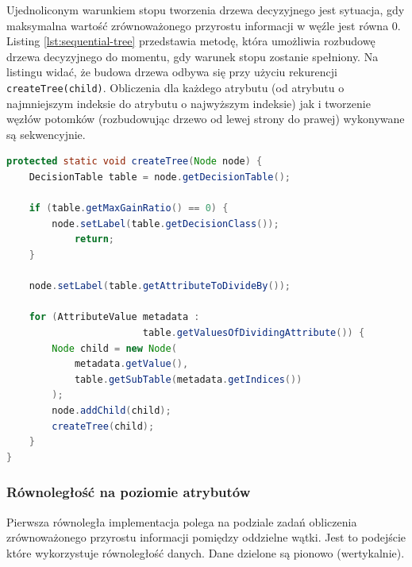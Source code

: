 \documentclass[12pt]{article}
\begin{document}
Ujednoliconym warunkiem stopu tworzenia drzewa decyzyjnego jest sytuacja, gdy maksymalna wartość zrównoważonego
przyrostu informacji w węźle jest równa 0. Listing \ref{lst:sequential-tree} przedstawia metodę, która
umożliwia rozbudowę drzewa decyzyjnego do momentu, gdy warunek stopu zostanie spełniony. Na listingu widać, że budowa
drzewa odbywa się przy użyciu rekurencji \verb|createTree(child)|.
Obliczenia dla każdego atrybutu (od atrybutu o najmniejszym indeksie do atrybutu o najwyższym indeksie) jak i tworzenie węzłów potomków
(rozbudowując drzewo od lewej strony do prawej) wykonywane są sekwencyjnie. 

\begin{lstlisting}[language=java, caption=Rekurencyjne tworzenie drzewa decyzyjnego,frame=single,label={lst:sequential-tree}]
protected static void createTree(Node node) {
    DecisionTable table = node.getDecisionTable();

    if (table.getMaxGainRatio() == 0) {
        node.setLabel(table.getDecisionClass());
            return;
    }

    node.setLabel(table.getAttributeToDivideBy());

    for (AttributeValue metadata :
                        table.getValuesOfDividingAttribute()) {
        Node child = new Node(
            metadata.getValue(),
            table.getSubTable(metadata.getIndices())
        );
        node.addChild(child);
        createTree(child);
    }
}
\end{lstlisting}

\subsubsection{Równoległość na poziomie atrybutów}\label{executor-service}

Pierwsza równoległa implementacja polega na podziale zadań obliczenia zrównoważonego przyrostu informacji pomiędzy oddzielne wątki.
Jest to podejście które wykorzystuje równoległość danych. Dane dzielone są pionowo (wertykalnie).
\end{document}
